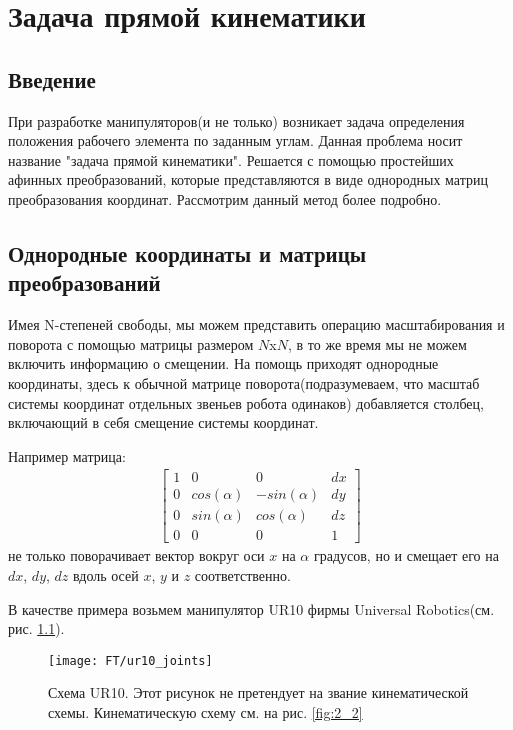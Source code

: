 \chapter{Задача прямой кинематики} \label{ch:2}

\section{Введение} \label{sect2_1}
При разработке манипуляторов(и не только) возникает задача определения положения рабочего элемента по заданным углам. Данная проблема носит название "задача прямой кинематики". Решается с помощью простейших афинных преобразований, которые представляются в виде однородных матриц преобразования координат. Рассмотрим данный метод более подробно.

\section{Однородные координаты и матрицы преобразований}\label{sect2_2}
Имея N-степеней свободы, мы можем представить операцию масштабирования и поворота с помощью матрицы размером $N$x$N$, в то же время мы не можем включить информацию о смещении. На помощь приходят однородные координаты, здесь к обычной матрице поворота(подразумеваем, что масштаб системы координат отдельных звеньев робота одинаков) добавляется столбец, включающий в себя смещение системы координат.

Например матрица:
\begin{align*}
	\begin{bmatrix}
		1	&	0				&	0				&	dx\\
		0	&	cos(\alpha)		&	-sin(\alpha)	&	dy\\
		0	&	sin(\alpha)		&	cos(\alpha)		&	dz\\
		0	&	0				&	0				&	1
	\end{bmatrix}
\end{align*}
не только поворачивает вектор вокруг оси $x$ на $\alpha$ градусов, но и смещает его на $dx$, $dy$, $dz$ вдоль осей $x$, $y$ и $z$ соответственно.

В качестве примера возьмем манипулятор UR10 фирмы Universal Robotics(см. рис. \ref{fig:ft_sheme1}). 
\begin{figure}[ht]
	\centering
	\texttt{[image: FT/ur10\_joints]}
	\caption{Схема UR10. Этот рисунок не претендует на звание кинематической схемы. Кинематическую схему см. на рис. \ref{fig:2_2}}
	\label{fig:ft_sheme1}
\end{figure}

